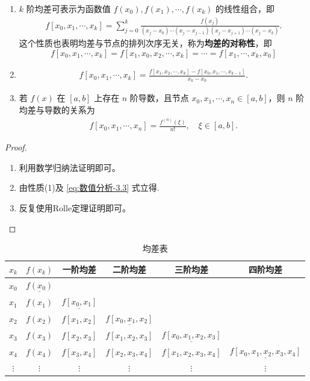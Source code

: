 \documentclass[../../main.tex]{subfiles}%
\begin{document}
\begin{theorem}[均差的基本性质]\label{theorem:均差的基本性质}
\begin{enumerate}[(1)]
\item $k$ 阶均差可表示为函数值 $f(x_0), f(x_1), \cdots, f(x_k)$ 的线性组合，即 
\begin{align}
f[x_0, x_1, \cdots, x_k] = \sum_{j = 0}^k \frac{f(x_j)}{(x_j - x_0) \cdots (x_j - x_{j - 1})(x_j - x_{j + 1}) \cdots (x_j - x_k)}. \label{eq:数值分析-3.4}
\end{align}
这个性质也表明均差与节点的排列次序无关，称为\textbf{均差的对称性}，即 
\[
f[x_0, x_1, \cdots, x_k] = f[x_1, x_0, x_2, \cdots, x_k] = \cdots = f[x_1, \cdots, x_k, x_0]
\]

\item \begin{align}
f[x_0, x_1, \cdots, x_k] = \frac{f[x_1, x_2, \cdots, x_k] - f[x_0, x_1, \cdots, x_{k - 1}]}{x_k - x_0}. \label{eq:数值分析-3.3'}
\end{align}

\item 若 $f(x)$ 在 $[a, b]$ 上存在 $n$ 阶导数，且节点 $x_0, x_1, \cdots, x_n \in [a, b]$，则 $n$ 阶均差与导数的关系为 
\begin{align}
f[x_0, x_1, \cdots, x_n] = \frac{f^{(n)}(\xi)}{n!}, \quad \xi \in [a, b].\label{eq:数值分析-3.5}
\end{align}
\end{enumerate}
\end{theorem}
\begin{proof}
\begin{enumerate}[(1)]
\item 利用数学归纳法证明即可。

\item 由性质(1)及 \eqref{eq:数值分析-3.3} 式立得.

\item 反复使用Rolle定理证明即可。
\end{enumerate}
\end{proof}
\begin{table}[H]
\centering
\caption{均差表}
\label{table:均差表}
\begin{tabular}{c|c|c|c|c|c}
\hline
$x_k$ & $f(x_k)$ & 一阶均差 & 二阶均差 & 三阶均差 & 四阶均差 \\
\hline
$x_0$ & $\underline{f(x_0)}$ &  &  &  &  \\
$x_1$ & $f(x_1)$ & $\underline{f[x_0, x_1]}$ &  &  &  \\
$x_2$ & $f(x_2)$ & $f[x_1, x_2]$ & $\underline{f[x_0, x_1, x_2]}$ &  &  \\
$x_3$ & $f(x_3)$ & $f[x_2, x_3]$ & $f[x_1, x_2, x_3]$ & $\underline{f[x_0, x_1, x_2, x_3]}$ &  \\
$x_4$ & $f(x_4)$ & $f[x_3, x_4]$ & $f[x_2, x_3, x_4]$ & $f[x_1, x_2, x_3, x_4]$ & $\underline{f[x_0, x_1, x_2, x_3, x_4]}$ \\
$\vdots$ & $\vdots$ & $\vdots$ & $\vdots$ & $\vdots$ & $\vdots$ \\
\hline
\end{tabular}
\end{table}
\end{document}
